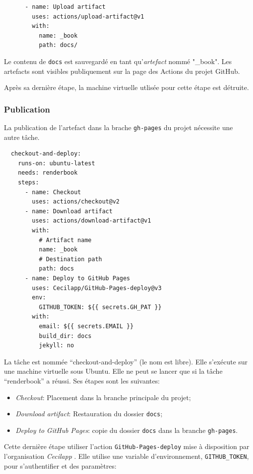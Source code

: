 \documentclass[
  11pt,
  french,
  a4paper,
  extrafontsizes,onecolumn,openright
  ]{memoir}
\providecommand{\tightlist}{%
  \setlength{\itemsep}{0pt}\setlength{\parskip}{0pt}}
\begin{document}
\begin{verbatim}
      - name: Upload artifact
        uses: actions/upload-artifact@v1
        with:
          name: _book
          path: docs/
\end{verbatim}

Le contenu de \texttt{docs} est sauvegardé en tant qu'\emph{artefact} nommé "\_book".
Les artefacts sont visibles publiquement sur la page des Actions du projet GitHub.

Après sa dernière étape, la machine virtuelle utlisée pour cette étape est détruite.

\hypertarget{publication}{%
\subsubsection{Publication}\label{publication}}

La publication de l'artefact dans la brache \texttt{gh-pages} du projet nécessite une autre tâche.

\begin{verbatim}
  checkout-and-deploy:
    runs-on: ubuntu-latest
    needs: renderbook
    steps:
      - name: Checkout
        uses: actions/checkout@v2
      - name: Download artifact
        uses: actions/download-artifact@v1
        with:
          # Artifact name
          name: _book
          # Destination path
          path: docs
      - name: Deploy to GitHub Pages
        uses: Cecilapp/GitHub-Pages-deploy@v3
        env:
          GITHUB_TOKEN: ${{ secrets.GH_PAT }}
        with:
          email: ${{ secrets.EMAIL }}
          build_dir: docs
          jekyll: no
\end{verbatim}

La tâche est nommée ``checkout-and-deploy'' (le nom est libre).
Elle s'exécute sur une machine virtuelle sous Ubuntu.
Elle ne peut se lancer que si la tâche ``renderbook'' a réussi.
Ses étapes sont les suivantes:

\begin{itemize}
\tightlist
\item
  \emph{Checkout}: Placement dans la branche principale du projet;
\item
  \emph{Download artifact}: Restauration du dossier \texttt{docs};
\item
  \emph{Deploy to GitHub Pages}: copie du dossier \texttt{docs} dans la branche \texttt{gh-pages}.
\end{itemize}

Cette dernière étape utiliser l'action \texttt{GitHub-Pages-deploy} mise à disposition par l'organisation \emph{Cecilapp} .
Elle utilise une variable d'environnement, \texttt{GITHUB\_TOKEN}, pour s'authentifier et des paramètres:
\end{document}
